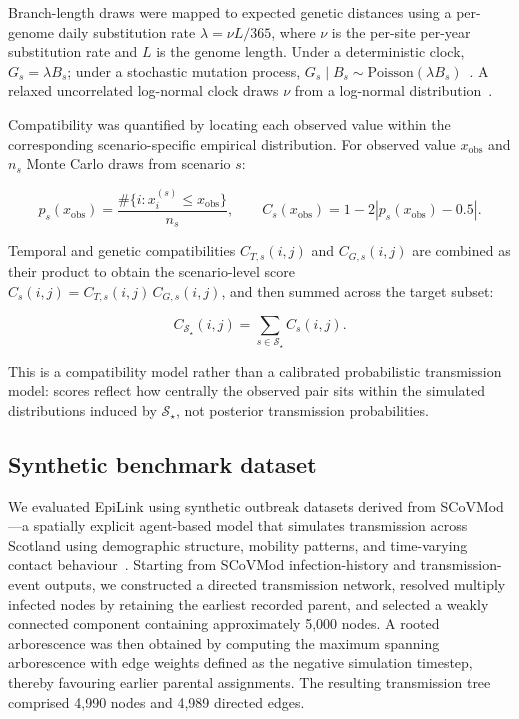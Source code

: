 \documentclass[10pt,letterpaper]{article}
\begin{document}
Branch-length draws were mapped to expected genetic distances using a per-genome daily substitution rate $\lambda = \nu L/365$, where $\nu$ is the per-site per-year substitution rate and $L$ is the genome length. Under a deterministic clock, $G_s = \lambda B_s$; under a stochastic mutation process, $G_s \mid B_s \sim \mathrm{Poisson}(\lambda B_s)$~\cite{Jombart2010}. A relaxed uncorrelated log-normal clock draws $\nu$ from a log-normal distribution~\cite{Drummond2006}.

Compatibility was quantified by locating each observed value within the corresponding scenario-specific empirical distribution. For observed value $x_{\mathrm{obs}}$ and $n_s$ Monte Carlo draws from scenario $s$:

\[
	p_s(x_{\mathrm{obs}}) = \frac{\#\{i : x_i^{(s)} \le x_{\mathrm{obs}}\}}{n_s},
	\qquad
	C_s(x_{\mathrm{obs}}) = 1 - 2\left|p_s(x_{\mathrm{obs}}) - 0.5\right|.
\]

Temporal and genetic compatibilities $C_{T,s}(i,j)$ and $C_{G,s}(i,j)$ are combined as their product to obtain the scenario-level score $C_s(i,j) = C_{T,s}(i,j)\, C_{G,s}(i,j)$, and then summed across the target subset:

\[
	C_{\mathcal{S}_\star}(i,j) = \sum_{s \in \mathcal{S}_\star} C_s(i,j).
\]

This is a compatibility model rather than a calibrated probabilistic transmission model: scores reflect how centrally the observed pair sits within the simulated distributions induced by $\mathcal{S}_\star$, not posterior transmission
probabilities.

\subsection*{Synthetic benchmark dataset}

We evaluated EpiLink using synthetic outbreak datasets derived from SCoVMod---a spatially explicit agent-based model that simulates transmission across Scotland using demographic structure, mobility patterns, and time-varying contact behaviour~\cite{Banks2022}. Starting from SCoVMod infection-history and transmission-event outputs, we constructed a directed transmission network, resolved multiply infected nodes by retaining the earliest recorded parent, and selected a weakly connected component containing approximately 5{,}000 nodes. A rooted arborescence was then obtained by computing the maximum spanning arborescence with edge weights defined as the negative simulation timestep, thereby favouring earlier parental assignments. The resulting transmission tree comprised 4{,}990 nodes and 4{,}989 directed edges.
\end{document}
